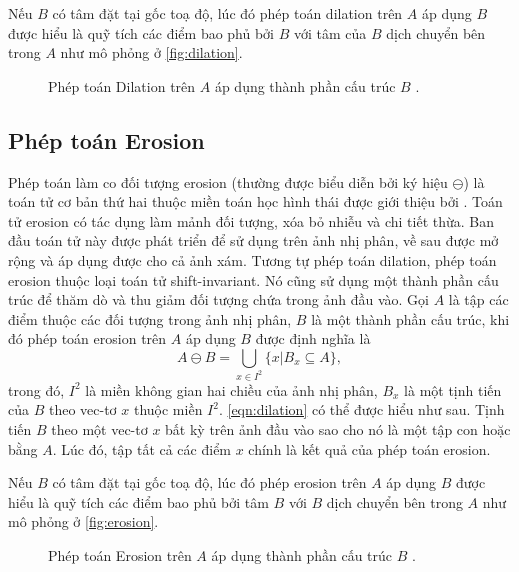 	Nếu $B$ có tâm đặt tại gốc toạ độ, lúc đó phép toán dilation trên $A$ áp dụng $B$ được hiểu là quỹ tích các điểm bao phủ bởi $B$ với tâm của $B$ dịch chuyển bên trong $A$ như mô phỏng ở \autoref{fig:dilation}.
	\begin{figure}[h!]
		\centering
		
		\caption[Phép toán Dilation trên $A$ áp dụng thành phần cấu trúc $B$.]{Phép toán Dilation trên $A$ áp dụng thành phần cấu trúc $B$ .}
		\label{fig:dilation}
	\end{figure}

\subsection{Phép toán Erosion}
\label{subsec:phep_toan_erosion}
	Phép toán làm co đối tượng erosion (thường được biểu diễn bởi ký hiệu $\ominus$) là toán tử cơ bản thứ hai thuộc miền toán học hình thái được giới thiệu bởi \citeauthor{weeks1996fundamentals} \cite{weeks1996fundamentals}. Toán tử erosion có tác dụng làm mảnh đối tượng, xóa bỏ nhiễu và chi tiết thừa. Ban đầu toán tử này được phát triển để sử dụng trên ảnh nhị phân, về sau được mở rộng và áp dụng được cho cả ảnh xám.
\newpage	
	Tương tự phép toán dilation, phép toán erosion thuộc loại toán tử shift-invariant. Nó cũng sử dụng một thành phần cấu trúc để thăm dò và thu giảm đối tượng chứa trong ảnh đầu vào. Gọi $A$ là tập các điểm thuộc các đối tượng trong ảnh nhị phân, $B$ là một thành phần cấu trúc, khi đó phép toán erosion trên $A$ áp dụng $B$ được định nghĩa là 
	\begin{equation}
	A \ominus B = \bigcup_{x\in I^2} \{x|B_x\subseteq A\},
	\label{eqn:erosion}
	\end{equation}
	trong đó, $I^2$ là miền không gian hai chiều của ảnh nhị phân, $B_x$ là một tịnh tiến của $B$ theo vec-tơ $x$ thuộc miền $I^2$. \autoref{eqn:dilation} có thể được hiểu như sau. Tịnh tiến $B$ theo một vec-tơ $x$ bất kỳ trên ảnh đầu vào sao cho nó là một tập con hoặc bằng $A$. Lúc đó, tập tất cả các điểm $x$ chính là kết quả của phép toán erosion. 
	
	Nếu $B$ có tâm đặt tại gốc toạ độ, lúc đó phép erosion trên $A$ áp dụng $B$ được hiểu là quỹ tích các điểm bao phủ bởi tâm $B$ với $B$ dịch chuyển bên trong $A$ như mô phỏng ở \autoref{fig:erosion}.
	\begin{figure}[h!]
		\centering
		
		\caption[Phép toán Erosion trên $A$ áp dụng thành phần cấu trúc $B$.]{Phép toán Erosion trên $A$ áp dụng thành phần cấu trúc $B$ .}
		\label{fig:erosion}
	\end{figure}


